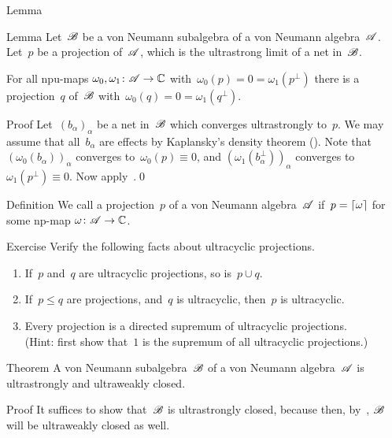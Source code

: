 \documentclass[a]{subfiles}
\begin{document}
\begin{parsec}
\begin{point}{Lemma}
\end{point}
\begin{point}{Lemma}%
Let~$\mathscr{B}$ be a von Neumann subalgebra
of a von Neumann algebra~$\mathscr{A}$.
Let~$p$ be a projection of~$\mathscr{A}$,
which is the ultrastrong limit of a net in~$\mathscr{B}$.

For all npu-maps $\omega_0,\omega_1\colon \mathscr{A}\to\mathbb{C}$
with~$\omega_0(p)=0= \omega_1(p^\perp)$
there is a projection~$q$ of~$\mathscr{B}$
with~$\omega_0(q)=0=\omega_1(q^\perp)$.
\begin{point}{Proof}%
Let~$(b_\alpha)_\alpha$ be a net in~$\mathscr{B}$
which converges ultrastrongly to~$p$.
We may assume that all~$b_\alpha$
are effects
by Kaplansky's density theorem ().
Note that~$(\omega_0(b_\alpha))_\alpha$ converges to~$\omega_0(p)\equiv 0$,
and $(\omega_1(b^\perp_\alpha))_\alpha$ converges 
to~$\omega_1(p^\perp)\equiv 0$.
Now apply~.\qed
\end{point}
\end{point}
\begin{point}{Definition}%
We call a projection~$p$ of a von Neumann algebra~$\mathscr{A}$
 if~$p=\left\lceil\omega\right\rceil$
for some np-map $\omega\colon \mathscr{A}\to\mathbb{C}$.
\end{point}
\begin{point}{Exercise}%
Verify the following facts about ultracyclic projections.
\begin{enumerate}
\item
If~$p$ and~$q$ are ultracyclic projections,
so is~$p\cup q$.
\item
If~$p \leq q$ are projections,
and~$q$ is ultracyclic,
then~$p$ is ultracyclic.
\item
Every projection is a directed supremum
of ultracyclic projections.\\
(Hint: first show that~$1$ is the supremum of all ultracyclic projections.)
\end{enumerate}
\end{point}
\begin{point}[vnsac]{Theorem}%
A von Neumann subalgebra~$\mathscr{B}$ of a von Neumann algebra~$\mathscr{A}$
is ultrastrongly and ultraweakly closed.
\begin{point}{Proof}%
It suffices to show that~$\mathscr{B}$ is ultrastrongly closed,
because then, by~, $\mathscr{B}$ will be ultraweakly closed
as well.


\end{point}
\end{point}
\end{parsec}
\end{document}
